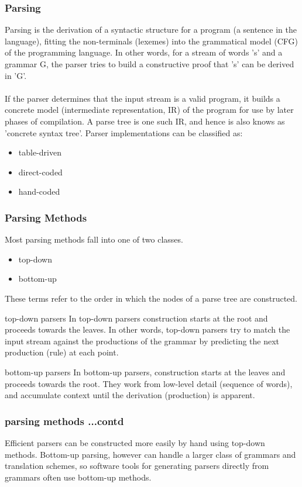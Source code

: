\documentclass[12]{beamer}
\begin{document}
%
%
\begin{frame}
\frametitle{Parsing}
Parsing is the derivation of a syntactic structure for a program (a sentence in the language), fitting the non-terminals (lexemes) into the grammatical model (CFG) of the programming language. In other words, for a stream of words 's' and a grammar G, the parser tries to build a constructive proof that 's' can be derived in 'G'.
\\~\\
If the parser determines that the input stream is a valid program, it builds a concrete model (intermediate representation, IR) of the program for use by later phases of compilation. A parse tree is one such IR, and hence is also knows as 'concrete syntax tree'. Parser implementations can be classified as:
\begin{itemize}
\item table-driven
\item direct-coded
\item hand-coded
\end{itemize}
\end{frame}

%
%
\begin{frame}
\frametitle{Parsing Methods}
Most parsing methods fall into one of two classes.
\begin{itemize}
\item top-down
\item bottom-up
\end{itemize}
These terms refer to the order in which the nodes of a parse tree are constructed.  
\begin{block}{top-down parsers}
In top-down parsers construction starts at the root and proceeds towards the leaves. In other words, top-down parsers try to match the input stream against the productions of the grammar by predicting the next production (rule) at each point.
\end{block}
\begin{block}{bottom-up parsers}
In bottom-up parsers, construction starts at the leaves and proceeds towards the root. They work from low-level detail (sequence of words), and accumulate context until the derivation (production) is apparent.
\end{block}
\end{frame}


%
%
\begin{frame}
\frametitle{parsing methods ...contd}
Efficient parsers can be constructed more easily by hand using top-down methods. Bottom-up parsing, however can handle a larger class of grammars and translation schemes, so software tools for generating parsers directly from grammars often use bottom-up methods.
\end{frame}
\end{document}

